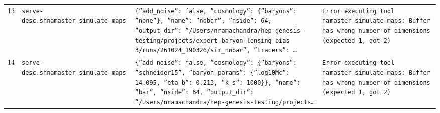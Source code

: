 \documentclass[11pt,a4paper]{article}
\begin{document}
\begin{longtable}{@{}p{}p{}p{}p{}@{}}
13 & \texttt{serve-desc.sh}\newline\texttt{namaster\_\allowbreak{}simulate\_\allowbreak{}maps} & \texttt{\{''add\_\allowbreak{}noise'':\allowbreak{} false,\allowbreak{} ''cosmology'':\allowbreak{} \{''baryons'':\allowbreak{} ''none''\}\allowbreak{},\allowbreak{} ''name'':\allowbreak{} ''nobar'',\allowbreak{} ''nside'':\allowbreak{} 64,\allowbreak{} ''output\_\allowbreak{}dir'':\allowbreak{} ''/\allowbreak{}Users/\allowbreak{}nramachandra/\allowbreak{}hep-genesis-testing/\allowbreak{}projects/\allowbreak{}expert-baryon-lensing-bias-3/\allowbreak{}runs/\allowbreak{}261024\_\allowbreak{}190326/\allowbreak{}sim\_\allowbreak{}nobar'',\allowbreak{} ''tracers'':\allowbreak{} \ldots{}\allowbreak{}} & \texttt{Error executing tool namaster\_\allowbreak{}simulate\_\allowbreak{}maps:\allowbreak{} Buffer has wrong number of dimensions (expected 1,\allowbreak{} got 2)\allowbreak{}} \\
14 & \texttt{serve-desc.sh}\newline\texttt{namaster\_\allowbreak{}simulate\_\allowbreak{}maps} & \texttt{\{''add\_\allowbreak{}noise'':\allowbreak{} false,\allowbreak{} ''cosmology'':\allowbreak{} \{''baryons'':\allowbreak{} ''schneider15'',\allowbreak{} ''baryon\_\allowbreak{}params'':\allowbreak{} \{''log10Mc'':\allowbreak{} 14.095,\allowbreak{} ''eta\_\allowbreak{}b'':\allowbreak{} 0.213,\allowbreak{} ''k\_\allowbreak{}s'':\allowbreak{} 1000\}\allowbreak{}\}\allowbreak{},\allowbreak{} ''name'':\allowbreak{} ''bar'',\allowbreak{} ''nside'':\allowbreak{} 64,\allowbreak{} ''output\_\allowbreak{}dir'':\allowbreak{} ''/\allowbreak{}Users/\allowbreak{}nramachandra/\allowbreak{}hep-genesis-testing/\allowbreak{}projects\ldots{}\allowbreak{}} & \texttt{Error executing tool namaster\_\allowbreak{}simulate\_\allowbreak{}maps:\allowbreak{} Buffer has wrong number of dimensions (expected 1,\allowbreak{} got 2)\allowbreak{}} \\
\bottomrule\end{longtable}
\end{document}
